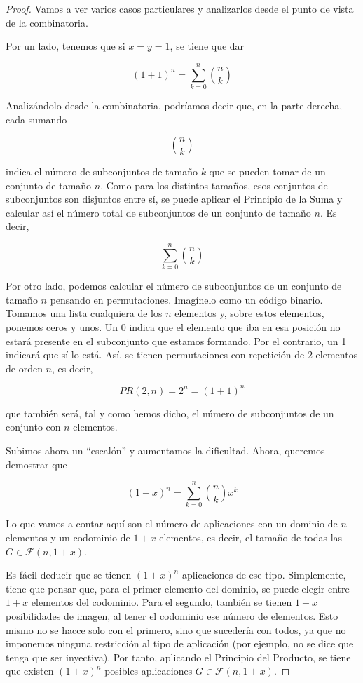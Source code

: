 \begin{proof}

  Vamos a ver varios casos particulares y analizarlos desde el punto de
  vista de la combinatoria.

  Por un lado, tenemos que si $x = y = 1$, se tiene que dar

  $$ (1 + 1)^n = \sum_{k=0}^n {n \choose k} $$

  \noindent Analizándolo desde la combinatoria, podríamos decir que, en la
  parte derecha, cada sumando

  $$ {n \choose k} $$

  \noindent indica el número de subconjuntos de tamaño $k$ que se pueden
  tomar de un conjunto de tamaño $n$. Como para los distintos tamaños, esos
  conjuntos de subconjuntos son disjuntos entre sí, se puede aplicar el
  Principio de la Suma y calcular así el número total de subconjuntos de un
  conjunto de tamaño $n$. Es decir,

  $$ \sum_{k=0}^n {n \choose k} $$

  Por otro lado, podemos calcular el número de subconjuntos de un conjunto
  de tamaño $n$ pensando en permutaciones. Imagínelo como un código binario.
  Tomamos una lista cualquiera de los $n$ elementos y, sobre estos
  elementos, ponemos ceros y unos. Un 0 indica que el elemento que iba en
  esa posición no estará presente en el subconjunto que estamos formando.
  Por el contrario, un 1 indicará que sí lo está. Así, se tienen
  permutaciones con repetición de 2 elementos de orden $n$, es decir,

  $$ PR(2, n) = 2^n = (1 + 1)^n $$

  \noindent que también será, tal y como hemos dicho, el número de
  subconjuntos de un conjunto con $n$ elementos.

  Subimos ahora un ``escalón'' y aumentamos la dificultad. Ahora, queremos
  demostrar que

  $$ (1 + x)^n = \sum_{k=0}^n {n \choose k} x^k $$

  Lo que vamos a contar aquí son el número de aplicaciones con un dominio de
  $n$ elementos y un codominio de $1 + x$ elementos, es decir, el tamaño de
  todas las $G \in \mathcal{F}(n, 1+x)$.

  Es fácil deducir que se tienen $(1 + x)^n$ aplicaciones de ese tipo.
  Simplemente, tiene que pensar que, para el primer elemento del dominio, se
  puede elegir entre $1 + x$ elementos del codominio. Para el segundo,
  también se tienen $1 + x$ posibilidades de imagen, al tener el codominio
  ese número de elementos. Esto mismo no se hacce solo con el primero, sino
  que sucedería con todos, ya que no imponemos ninguna restricción al tipo
  de aplicación (por ejemplo, no se dice que tenga que ser inyectiva). Por
  tanto, aplicando el Principio del Producto, se tiene que existen $(1+x)^n$
  posibles aplicaciones $G \in \mathcal{F}(n, 1+x)$.


\end{proof}
